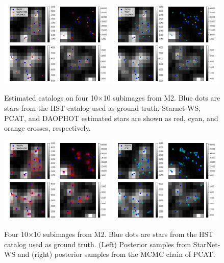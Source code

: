 \begin{figure}[ht]
    \centering
    \includegraphics[width=0.49\textwidth]{figures/example_subimages_ws.png}
    \includegraphics[width=0.49\textwidth]{figures/example_subimages_pcat.png}
    \caption{Estimated catalogs on four 10$\times$10 subimages from
    M2. Blue dots are stars from the HST catalog used as ground truth. 
    Starnet-WS, PCAT, and DAOPHOT estimated stars are shown as
    red, cyan, and orange crosses, respectively. }
    \label{fig:example_subimages}
\end{figure}

\begin{figure}[ht]
    \centering
    \includegraphics[width=0.49\textwidth]{figures/example_subimages_samples_ws.png}
    \includegraphics[width=0.49\textwidth]{figures/example_subimages_samples_pcat.png}
    \caption{Four 10$\times$10 subimages from
    M2. Blue dots are stars from the HST catalog used as ground truth. (Left) Posterior samples from StarNet-WS and (right) posterior samples from the MCMC chain of PCAT. }
    \label{fig:example_subimages_sampled}
\end{figure}

